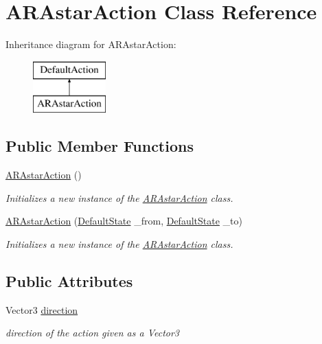 \hypertarget{class_a_r_astar_action}{\section{A\-R\-Astar\-Action Class Reference}
\label{class_a_r_astar_action}
}
Inheritance diagram for A\-R\-Astar\-Action\-:\begin{figure}[H]
\begin{center}
\leavevmode
\includegraphics[height=2.000000cm]{class_a_r_astar_action}
\end{center}
\end{figure}
\subsection*{Public Member Functions}
\begin{DoxyCompactItemize}
\item 
\hyperlink{class_a_r_astar_action_a8df659204ab99fd85f1b925007cf17e7}{A\-R\-Astar\-Action} ()
\begin{DoxyCompactList}\small\item\em Initializes a new instance of the \hyperlink{class_a_r_astar_action}{A\-R\-Astar\-Action} class. \end{DoxyCompactList}\item 
\hyperlink{class_a_r_astar_action_a953c37f988df7b6c603c22e326b8180e}{A\-R\-Astar\-Action} (\hyperlink{class_default_state}{Default\-State} \-\_\-from, \hyperlink{class_default_state}{Default\-State} \-\_\-to)
\begin{DoxyCompactList}\small\item\em Initializes a new instance of the \hyperlink{class_a_r_astar_action}{A\-R\-Astar\-Action} class. \end{DoxyCompactList}\end{DoxyCompactItemize}
\subsection*{Public Attributes}
\begin{DoxyCompactItemize}
\item 
\hypertarget{class_a_r_astar_action_a67c203d535ee1b18ddec483a74b5923e}{Vector3 \hyperlink{class_a_r_astar_action_a67c203d535ee1b18ddec483a74b5923e}{direction}}\label{class_a_r_astar_action_a67c203d535ee1b18ddec483a74b5923e}

\begin{DoxyCompactList}\small\item\em direction of the action given as a Vector3 \end{DoxyCompactList}\end{DoxyCompactItemize}


